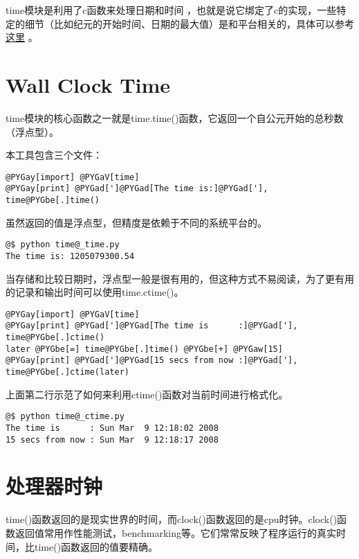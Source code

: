 \documentclass[a4paper,10pt,english]{manual}
\begin{document}
time模块是利用了c函数来处理日期和时间 ，也就是说它绑定了c的实现，一些特定的细节（比如纪元的开始时间、日期的最大值）是和平台相关的，具体可以参考 \href{http://docs.python.org/lib/module-time.html}{这里} 。


\section{Wall Clock Time}

time模块的核心函数之一就是time.time()函数，它返回一个自公元开始的总秒数（浮点型）。

本工具包含三个文件：

\begin{Verbatim}[commandchars=@\[\]]
@PYGay[import] @PYGaV[time]
@PYGay[print] @PYGad[']@PYGad[The time is:]@PYGad['], time@PYGbe[.]time()
\end{Verbatim}

虽然返回的值是浮点型，但精度是依赖于不同的系统平台的。

\begin{Verbatim}[commandchars=@\[\]]
@$ python time@_time.py
The time is: 1205079300.54
\end{Verbatim}

当存储和比较日期时，浮点型一般是很有用的，但这种方式不易阅读，为了更有用的记录和输出时间可以使用time.ctime()。

\begin{Verbatim}[commandchars=@\[\]]
@PYGay[import] @PYGaV[time]
@PYGay[print] @PYGad[']@PYGad[The time is      :]@PYGad['], time@PYGbe[.]ctime()
later @PYGbe[=] time@PYGbe[.]time() @PYGbe[+] @PYGaw[15]
@PYGay[print] @PYGad[']@PYGad[15 secs from now :]@PYGad['], time@PYGbe[.]ctime(later)
\end{Verbatim}

上面第二行示范了如何来利用ctime()函数对当前时间进行格式化。

\begin{Verbatim}[commandchars=@\[\]]
@$ python time@_ctime.py
The time is      : Sun Mar  9 12:18:02 2008
15 secs from now : Sun Mar  9 12:18:17 2008
\end{Verbatim}


\section{处理器时钟}

time()函数返回的是现实世界的时间，而clock()函数返回的是cpu时钟。clock()函数返回值常用作性能测试，benchmarking等。它们常常反映了程序运行的真实时间，比time()函数返回的值要精确。
\end{document}
